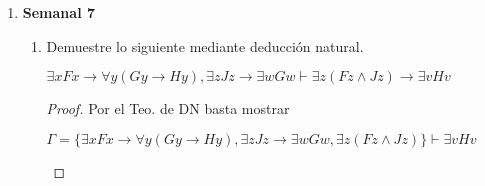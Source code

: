 \documentclass[letterpaper,12pt]{article}
\begin{document}
\begin{enumerate}
    \item \textbf{Semanal 7}
    \begin{enumerate}
        \item Demuestre lo siguiente mediante deducción natural.
        
        \begin{center}
            $\exists x Fx \rightarrow \forall y (Gy \rightarrow Hy),
            \exists z Jz \rightarrow \exists w Gw 
            \vdash \exists z (Fz \land Jz) \rightarrow \exists v Hv$
        \end{center}
        \begin{proof}
            Por el Teo. de DN basta mostrar

            \begin{center}
                $\Gamma = \{ \exists x Fx \rightarrow 
                \forall y(Gy \rightarrow Hy), \exists z Jz \rightarrow 
                \exists w Gw, \exists z(Fz \land Jz) \} \vdash\exists v Hv$
            \end{center}
            

\end{proof}
\end{enumerate}
\end{enumerate}
\end{document}
